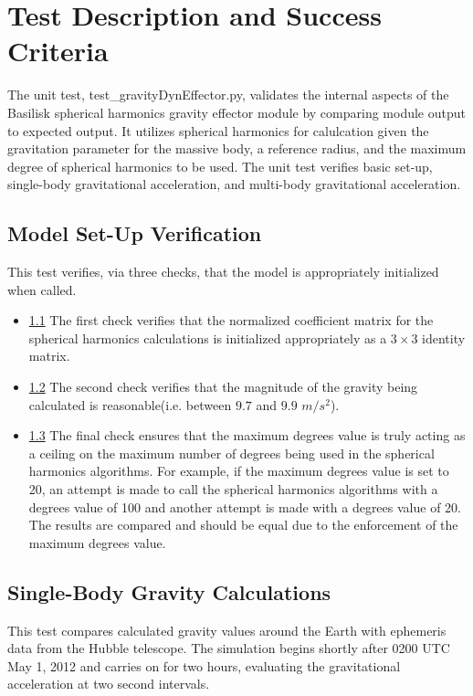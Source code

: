 \section{Test Description and Success Criteria}
The unit test, test\_gravityDynEffector.py,  validates the internal aspects of the Basilisk spherical harmonics gravity effector module by comparing module output to expected output. It utilizes spherical harmonics for calulcation given the gravitation parameter for the massive body, a reference radius, and the maximum degree of spherical harmonics to be used. The unit test verifies basic set-up, single-body gravitational acceleration, and multi-body gravitational acceleration.

\subsection{Model Set-Up Verification}
This test verifies, via three checks, that the model is appropriately initialized when called.
		\begin{itemize}
			\item \underline{1.1} The first check verifies that the normalized coefficient matrix for the spherical harmonics calculations is initialized appropriately as a $3\times3$ identity matrix. \\
			\item \underline{1.2} The second check verifies that the magnitude of the gravity being calculated is reasonable(i.e. between $9.7$ and $9.9$ $m/s^2$). \\
			\item \underline{1.3} The final check ensures that the maximum degrees value is truly acting as a ceiling on the maximum number of degrees being used in the spherical harmonics algorithms. For example, if the maximum degrees value is set to 20, an attempt is made to call the spherical harmonics algorithms with a degrees value of 100 and another attempt is made with a degrees value of 20. The results are compared and should be equal due to the enforcement of the maximum degrees value.\\
		\end{itemize}
\subsection{Single-Body Gravity Calculations} This test compares calculated gravity values around the Earth with ephemeris data from the Hubble telescope. The simulation begins shortly after 0200 UTC May 1, 2012 and carries on for two hours, evaluating the gravitational acceleration at two  second intervals.
